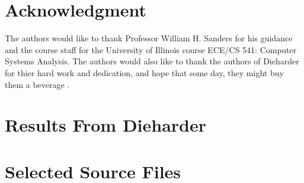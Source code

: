 \documentclass[conference,11pt]{IEEEtran}
\begin{document}
\section*{Acknowledgment}
The authors would like to thank Professor William H. Sanders for his guidance and the course staff for the University of Illinois course ECE/CS 541: Computer Systems Analysis. The authors would also like to thank the authors of Dieharder for thier hard work and dedication, and hope that some day, they might buy them a beverage \cite{bev_mod}.

\newpage
\onecolumn

\appendices

\renewcommand\thefigure{\thesection.\arabic{figure}}
\setcounter{figure}{0}

\section{Results From Dieharder}
\label{app:results}


\newpage

\section{Selected Source Files}
\label{app:source}


\newpage
\twocolumn



\end{document}
